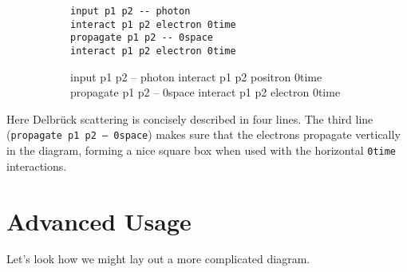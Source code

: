 \documentclass[12pt]{article}
\begin{document}
\begin{figure}[h!]\begin{subfigure}[h]{0.4\textwidth}\begin{center}
\begin{lstlisting}
input p1 p2 -- photon
interact p1 p2 electron 0time
propagate p1 p2 -- 0space
interact p1 p2 electron 0time
\end{lstlisting}
\end{center}\end{subfigure}\hfill\vrule\hfill\begin{subfigure}[h]{0.4\textwidth}\begin{center}
\begin{feynr}
input p1 p2 -- photon
interact p1 p2 positron 0time
propagate p1 p2 -- 0space
interact p1 p2 electron 0time
\end{feynr}
\end{center}\end{subfigure}\end{figure}
Here Delbr\"uck scattering is concisely described in four lines.
The third line (\texttt{propagate p1 p2 -- 0space}) makes sure that the electrons propagate vertically in the diagram, forming a nice square box when used with the horizontal \texttt{0time} interactions.

\newpage
\section*{Advanced Usage}
Let's look how we might lay out a more complicated diagram.
\end{document}
